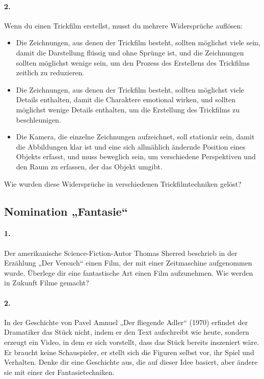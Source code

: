 \documentclass[11pt,a4paper]{article}
\begin{document}
\paragraph{2.}
Wenn du einen Trickfilm erstellst, musst du mehrere Widersprüche auflösen:
\begin{itemize}
\item Die Zeichnungen, aus denen der Trickfilm besteht, sollten möglichst
  viele sein, damit die Darstellung flüssig und ohne Sprünge ist, und die
  Zeichnungen sollten möglichst wenige sein, um den Prozess des Erstellens des
  Trickfilms zeitlich zu reduzieren.
\item Die Zeichnungen, aus denen der Trickfilm besteht, sollten möglichst
  viele Details enthalten, damit die Charaktere emotional wirken, und sollten
  möglichst wenige Details enthalten, um die Erstellung des Trickfilms zu
  beschleunigen. 
\item Die Kamera, die einzelne Zeichnungen aufzeichnet, soll stationär sein,
  damit die Abbildungen klar ist und eine sich allmählich ändernde Position
  eines Objekts erfasst, und muss beweglich sein, um verschiedene Perspektiven
  und den Raum zu erfassen, der das Objekt umgibt.
\end{itemize}
Wie wurden diese Widersprüche in verschiedenen Trickfilmtechniken gelöst?

\subsection*{Nomination „Fantasie“}

\paragraph{1.}
Der amerikanische Science-Fiction-Autor Thomas Sherred beschrieb in der
Erzählung „Der Versuch“ einen Film, der mit einer Zeitmaschine aufgenommen
wurde.  Überlege dir eine fantastische Art einen Film aufzunehmen. Wie werden
in Zukunft Filme gemacht?

\paragraph{2.}
In der Geschichte von Pavel Amnuel „Der fliegende Adler“ (1970) erfindet der
Dramatiker das Stück nicht, indem er den Text aufschreibt wie heute, sondern
erzeugt ein Video, in dem er sich vorstellt, dass das Stück bereits inszeniert
wäre. Er braucht keine Schauspieler, er stellt sich die Figuren selbst vor,
ihr Spiel und Verhalten. Denke dir eine Geschichte aus, die auf dieser Idee
basiert, aber ändere sie mit einer der Fantasietechniken.
\end{document}
